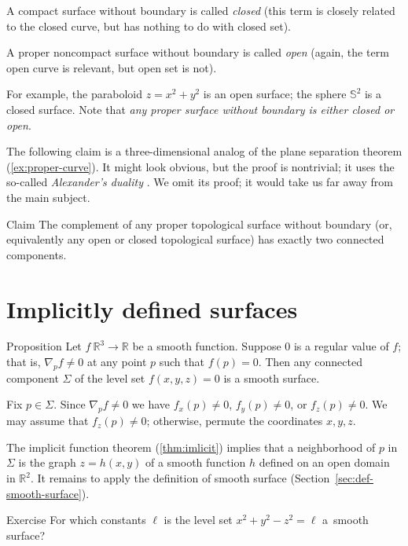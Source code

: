 A compact surface without boundary is called \emph{closed}
(this term is closely related to the closed curve, but has nothing to do with closed set).

A proper noncompact surface without boundary is called \emph{open} (again, the term open curve is relevant, but open set is not).

For example, the paraboloid $z=x^2+y^2$
is an open surface; the 
sphere $\mathbb{S}^2$ is a closed surface.
Note that \textit{any proper surface without boundary is either closed or open}.

The following claim is a three-dimensional analog of the plane separation theorem (\ref{ex:proper-curve}).
It might look obvious, but the proof is nontrivial; it uses the so-called {}\emph{Alexander's duality} \cite{hatcher}.
We omit its proof; it would take us far away from the main subject.

\begin{thm}{Claim}\label{clm:proper-divides}
The complement of any proper topological surface without boundary (or, equivalently any open or closed topological surface) has exactly two connected components. 
\end{thm}



\section{Implicitly defined surfaces}

\begin{thm}{Proposition}\label{prop:implicit-surface}
Let $f\:\mathbb{R}^3\to \mathbb{R}$ be a smooth function.
Suppose $0$ is a regular value of $f$;
that is, $\nabla_p f\ne 0$ at any point $p$ such that $f(p)=0$.
Then any connected component $\Sigma$ of the level set  $f(x,y,z)=0$ is a smooth surface.
\end{thm}

Fix $p\in\Sigma$.
Since $\nabla_p f\ne 0$ we have 
$f_x(p)\ne 0$,
$f_y(p)\ne 0$, or
$f_z(p)\ne 0$.
We may assume that $f_z(p)\ne 0$;
otherwise, permute the coordinates $x,y,z$.

The implicit function theorem (\ref{thm:imlicit}) implies that a neighborhood of $p$ in $\Sigma$ is the graph $z=h(x,y)$ of a smooth function $h$ defined on an open domain in $\mathbb{R}^2$.
It remains to apply the definition of smooth surface (Section~\ref{sec:def-smooth-surface}).
\qeds

\begin{thm}{Exercise}\label{ex:hyperboloids}
For which constants $\ell$ is the level set $x^2+y^2-z^2=\ell$
a~smooth surface?
\end{thm}

